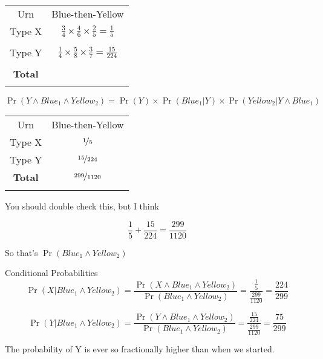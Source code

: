 \documentclass[
  ignorenonframetext,
]{beamer}
\renewcommand{\,}{\text{, }}
\begin{document}
\begin{frame}
\begin{longtable}[]{@{}cc@{}}
\toprule
Urn & Blue-then-Yellow \\ \addlinespace
\midrule
\endhead
Type X &
\(\frac{3}{4} \times \frac{4}{6} \times \frac{2}{5} = \frac{1}{5}\) \\ \addlinespace
& \\ \addlinespace
Type Y &
\(\frac{1}{4} \times \frac{5}{8} \times \frac{3}{7} = \frac{15}{224}\) \\ \addlinespace
& \\ \addlinespace
\textbf{Total} & \\ \addlinespace
\bottomrule
\end{longtable}

\[
\Pr(Y \wedge Blue_1 \wedge Yellow_2) = \Pr(Y) \times \Pr(Blue_1 | Y) \times \Pr(Yellow_2 | Y \wedge Blue_1)
\]
\end{frame}

\begin{frame}
\begin{longtable}[]{@{}cc@{}}
\toprule
Urn & Blue-then-Yellow \\ \addlinespace
\midrule
\endhead
Type X & \(\nicefrac{1}{5}\) \\ \addlinespace
Type Y & \(\nicefrac{15}{224}\) \\ \addlinespace
\textbf{Total} & \(\nicefrac{299}{1120}\) \\ \addlinespace
\bottomrule
\end{longtable}

You should double check this, but I think

\[
\frac{1}{5} + \frac{15}{224} = \frac{299}{1120}
\]

\bigskip

So that's \(\Pr(Blue_1 \wedge Yellow_2)\)
\end{frame}

\begin{frame}{Conditional Probabilities}
\protect\hypertarget{conditional-probabilities}{}
\[
\Pr(X | Blue_1 \wedge Yellow_2) = \frac{\Pr(X \wedge Blue_1 \wedge Yellow_2)}{\Pr(Blue_1 \wedge Yellow_2)} = \frac{\frac{1}{5}}{\frac{299}{1120}} = \frac{224}{299}
\]

\[
\Pr(Y | Blue_1 \wedge Yellow_2) = \frac{\Pr(Y \wedge Blue_1 \wedge Yellow_2)}{\Pr(Blue_1 \wedge Yellow_2)} = \frac{\frac{15}{224}}{\frac{299}{1120}} = \frac{75}{299}
\]

The probability of Y is ever so fractionally higher than when we
started.
\end{frame}
\end{document}
